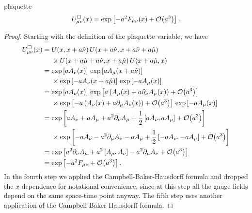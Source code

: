 \begin{proposition}{}{plaquette}
$$
U^\Box_{\mu\nu}(x)=\exp\left[-a^2F_{\mu\nu}(x)+\order{a^3}\right].
$$
  \begin{proof}
    Starting with the definition of the plaquette variable, we have
    \begin{equation*}\begin{aligned}
      U^\Box_{\mu\nu}(x)&=U(x,x+a\hat\nu)\,U(x+a\hat\nu,x+a\hat\nu+a\hat\mu)\\
               &~~~~\times U(x+a\hat\mu+a\hat\nu,x+a\hat\mu)\,U(x+a\hat\mu,x)\\
            &=\exp\left[aA_\nu(x)\right]\,
              \exp\left[aA_\mu(x+a\hat\nu)\right]\\
               &~~~~\times\exp\left[-aA_\nu(x+a\hat\mu)\right]\,
                \exp\left[-aA_\mu(x)\right]\\
            &=\exp\left[aA_\nu(x)\right]\,
               \exp\left[a\left( A_\mu(x)+a\partial_\nu A_\mu(x) \right)
                                 +\order{a^3}\right]\\
               &~~~~\times
               \exp\left[-a\left(A_\nu(x)+a\partial_\mu A_\nu(x) \right)
                                 +\order{a^3}\right]\,
               \exp\left[-aA_\mu(x)\right]\\
            &=\exp\left[aA_\nu+aA_\mu+a^2\partial_\nu A_\mu
                 +\frac{1}{2}\left[aA_\nu,aA_\mu\right]
                 +\order{a^3}\right]\\
            &~~~~\times\exp\left[-aA_\nu-a^2\partial_\mu A_\nu-aA_\mu
                 +\frac{1}{2}\left[-aA_\nu,-aA_\mu\right]
                 +\order{a^3}\right]\\
            &=\exp\left[a^2\partial_\nu A_\mu+a^2\left[A_\mu,A_\nu\right]
                 -a^2\partial_\mu A_\nu+\order{a^3}\right]\\
            &=\exp\left[-a^2F_{\mu\nu}+\order{a^3}\right].
    \end{aligned}\end{equation*}
    In the fourth step we applied the Campbell-Baker-Hausdorff formula and
    dropped the $x$ dependence for notational convenience, since at this
    step all the gauge fields depend on the same space-time point anyway.
    The fifth step uses another application of the Campbell-Baker-Hausdorff
    formula.
  \end{proof}
\end{proposition}


